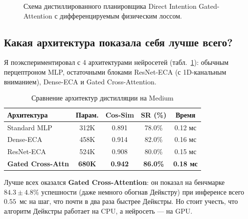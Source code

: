 \begin{figure}[t]
    \centering
    
    \caption{Схема дистиллированного планировщика Direct Intention Gated-Attention с дифференцируемым физическим лоссом.}
    \label{fig:distilled_jax}
    \vspace{-2mm}
\end{figure}

\subsection{Какая архитектура показала себя лучше всего?}

Я поэкспериментировал с 4 архитектурами нейросетей (табл.~\ref{tab:arch_comparison}): обычным перцептроном MLP, остаточными блоками ResNet-ECA (с 1D-канальным вниманием), Dense-ECA и Gated Cross-Attention.

\begin{table}[H]
    \centering
    \footnotesize
    \setlength{\tabcolsep}{4pt}
    \caption{Сравнение архитектур дистилляции на Medium}
    \label{tab:arch_comparison}
    \begin{tabular}{lcccc}
        \toprule
        \textbf{Архитектура} & \textbf{Парам.} & \textbf{Cos-Sim} & \textbf{SR (\%)} & \textbf{Время} \\
        \midrule
        Standard MLP & 312K & 0.891 & 78.0\% & 0.12 мс \\
        Dense-ECA & 458K & 0.914 & 82.0\% & 0.16 мс \\
        ResNet-ECA & 524K & 0.908 & 80.0\% & 0.15 мс \\
        \textbf{Gated Cross-Attn} & \textbf{680K} & \textbf{0.942} & \textbf{86.0\%} & \textbf{0.18 мс} \\
        \bottomrule
    \end{tabular}
\end{table}

Лучше всех оказался \textbf{Gated Cross-Attention}: он показал на бенчмарке $84.3 \pm 4.8\%$ успешности (даже немного обогнав Дейкстру) при инференсе всего $0.55$~мс на шаг, что почти в два раза быстрее Дейкстры. Но стоит учесть, что алгоритм Дейкстры работает на CPU, а нейросеть — на GPU.

